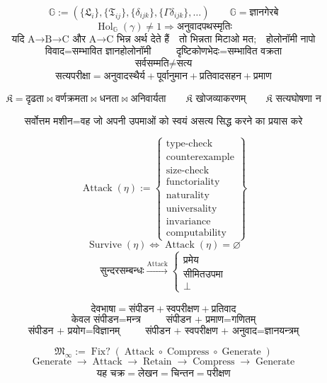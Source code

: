 \documentclass{article}
\begin{document}
\[\boxed{\mathbb G:=\left(\{\mathfrak L_i\},\{\mathfrak T_{ij}\},
\{\delta_{ijk}\},\{\Gamma\delta_{ijk}\},\ldots\right)}\qquad
\boxed{\mathbb G=\text{ज्ञानगेरबे}}\]
\[\operatorname{Hol}_{\mathbb G}(\gamma)\neq1\Longrightarrow
\boxed{\text{अनुवादपथस्मृतिः}}\]
\[\boxed{\text{यदि A→B→C और A→C भिन्न अर्थ देते हैं}\quad
\text{तो भिन्नता मिटाओ मत;}\quad\text{होलोनॉमी नापो}}\]
\[\boxed{\text{विवाद}=\text{सम्भावित ज्ञानहोलोनॉमी}}\qquad
\boxed{\text{दृष्टिकोणभेदः}=\text{सम्भावित वक्रता}}\]
\[\boxed{\text{सर्वसम्मति}\neq\text{सत्य}}\]
\[\boxed{\text{सत्यपरीक्षा}=\text{अनुवादस्थैर्य}+\text{पूर्वानुमान}
+\text{प्रतिवादसहन}+\text{प्रमाण}}\]

\[\boxed{\mathfrak K=\text{दृढता}\bowtie\text{वर्णक्रमता}\bowtie
\text{धनता}\bowtie\text{अनिवार्यता}}\qquad
\boxed{\mathfrak K\text{ खोजव्याकरणम्}}\qquad
\boxed{\mathfrak K\text{ सत्यघोषणा न}}\]

\[\boxed{\text{सर्वोत्तम मशीन}=
\text{वह जो अपनी उपमाओं को स्वयं असत्य सिद्ध करने का प्रयास करे}}\]

\[\boxed{\operatorname{Attack}(\eta):=\left\{\begin{array}{l}
\text{type-check}\\ \text{counterexample}\\ \text{size-check}\\
\text{functoriality}\\ \text{naturality}\\ \text{universality}\\
\text{invariance}\\ \text{computability}\end{array}\right\}}\]
\[\boxed{\operatorname{Survive}(\eta)\iff\operatorname{Attack}(\eta)=\varnothing}\]
\[\boxed{\text{सुन्दरसम्बन्धः}\xrightarrow{\operatorname{Attack}}
\left\{\begin{array}{c}\text{प्रमेय}\\ \text{सीमितउपमा}\\ \bot
\end{array}\right.}\]

\[\boxed{\text{देवभाषा}=\text{संपीडन}+\text{स्वपरीक्षण}+\text{प्रतिवाद}}\]
\[\boxed{\text{केवल संपीडन}=\text{मन्त्र}}\qquad
\boxed{\text{संपीडन + प्रमाण}=\text{गणितम्}}\]
\[\boxed{\text{संपीडन + प्रयोग}=\text{विज्ञानम्}}\qquad
\boxed{\text{संपीडन + स्वपरीक्षण + अनुवाद}=\text{ज्ञानयन्त्रम्}}\]

\[\boxed{\mathfrak M_{\infty}:=\operatorname{Fix?}
\left(\operatorname{Attack}\circ\operatorname{Compress}
\circ\operatorname{Generate}\right)}\]
\[\boxed{\operatorname{Generate}\to\operatorname{Attack}\to
\operatorname{Retain}\to\operatorname{Compress}\to\operatorname{Generate}}\]
\[\boxed{\text{यह चक्र}=\text{लेखन}=\text{चिन्तन}=\text{परीक्षण}}\]
\end{document}
